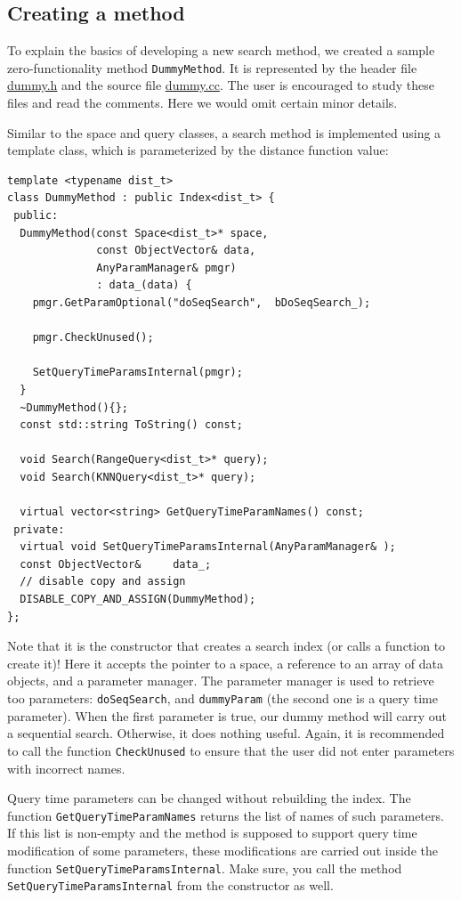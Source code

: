 \documentclass[runningheads,a4paper]{llncs}
\newcommand{\replocfile}{https://github.com/searchivarius/NonMetricSpaceLib/blob/pserv/}
\newcommand{\ttt}[1]{\texttt{#1}}
\begin{document}
\subsection{Creating a method}\label{SectionCreateMethod}
To explain the basics of developing a new search method,
we created a sample zero-functionality method \ttt{DummyMethod}.
It is represented by 
the header file 
\href{\replocfile similarity_search/include/method/dummy.h}{dummy.h}
and the source file
\href{\replocfile similarity_search/src/method/dummy.cc}{dummy.cc}.
The user is encouraged to study these files and read the comments.
Here we would omit certain minor details.

Similar to the space and query classes, a search method is implemented using
a template class, which is parameterized by the distance function value:

\begin{verbatim}
template <typename dist_t>
class DummyMethod : public Index<dist_t> {
 public:
  DummyMethod(const Space<dist_t>* space, 
              const ObjectVector& data, 
              AnyParamManager& pmgr) 
              : data_(data) {
    pmgr.GetParamOptional("doSeqSearch",  bDoSeqSearch_);

    pmgr.CheckUnused();

    SetQueryTimeParamsInternal(pmgr);
  }
  ~DummyMethod(){};
  const std::string ToString() const;
   
  void Search(RangeQuery<dist_t>* query);
  void Search(KNNQuery<dist_t>* query);

  virtual vector<string> GetQueryTimeParamNames() const;
 private: 
  virtual void SetQueryTimeParamsInternal(AnyParamManager& );
  const ObjectVector&     data_;
  // disable copy and assign
  DISABLE_COPY_AND_ASSIGN(DummyMethod);
};
\end{verbatim}

Note that it is the constructor that creates a search index (or calls a function to create it)!
Here it accepts the pointer to a space,
a reference to an array of data objects, 
and a parameter manager.
The parameter manager is used to retrieve too parameters:
\ttt{doSeqSearch}, and \ttt{dummyParam} (the second one is a query time parameter).
When the first parameter is true, our dummy method will carry out a sequential search.
Otherwise, it does nothing useful.
Again, it is recommended to call the function \ttt{CheckUnused} to ensure
that the user did not enter parameters with incorrect names.

Query time parameters can be changed
without rebuilding the index.
The function \ttt{GetQueryTimeParamNames} returns the list of 
names of such parameters.
If this list is non-empty and the method is supposed to support
query time modification of some parameters,
these modifications are carried out inside the function  
\ttt{SetQueryTimeParamsInternal}.
Make sure, you call the method \ttt{SetQueryTimeParamsInternal} from the constructor as well.
\end{document}
